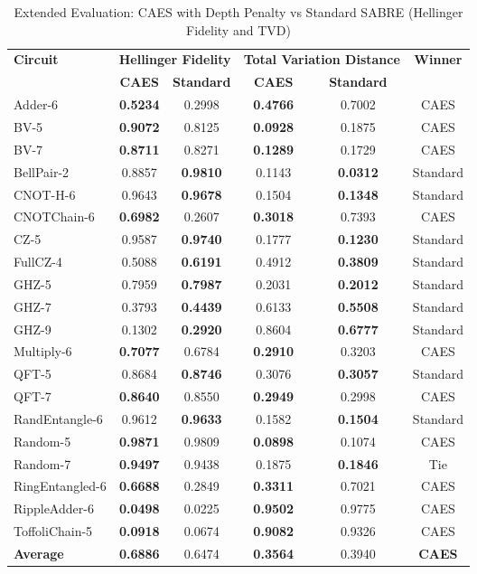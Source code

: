 \documentclass[conference]{IEEEtran}
\begin{document}
\begin{table*}[t]
\centering
\caption{Extended Evaluation: CAES with Depth Penalty vs Standard SABRE (Hellinger Fidelity and TVD)}
\label{tab:extended_results}
\scriptsize
\begin{tabular}{|l|c|c|c|c|c|}
\hline
\textbf{Circuit} & \multicolumn{2}{c|}{\textbf{Hellinger Fidelity}} & \multicolumn{2}{c|}{\textbf{Total Variation Distance}} & \textbf{Winner} \\
 & \textbf{CAES} & \textbf{Standard} & \textbf{CAES} & \textbf{Standard} & \\
\hline
Adder-6 & \textbf{0.5234} & 0.2998 & \textbf{0.4766} & 0.7002 & CAES \\
BV-5 & \textbf{0.9072} & 0.8125 & \textbf{0.0928} & 0.1875 & CAES \\
BV-7 & \textbf{0.8711} & 0.8271 & \textbf{0.1289} & 0.1729 & CAES \\
BellPair-2 & 0.8857 & \textbf{0.9810} & 0.1143 & \textbf{0.0312} & Standard \\
CNOT-H-6 & 0.9643 & \textbf{0.9678} & 0.1504 & \textbf{0.1348} & Standard \\
CNOTChain-6 & \textbf{0.6982} & 0.2607 & \textbf{0.3018} & 0.7393 & CAES \\
CZ-5 & 0.9587 & \textbf{0.9740} & 0.1777 & \textbf{0.1230} & Standard \\
FullCZ-4 & 0.5088 & \textbf{0.6191} & 0.4912 & \textbf{0.3809} & Standard \\
GHZ-5 & 0.7959 & \textbf{0.7987} & 0.2031 & \textbf{0.2012} & Standard \\
GHZ-7 & 0.3793 & \textbf{0.4439} & 0.6133 & \textbf{0.5508} & Standard \\
GHZ-9 & 0.1302 & \textbf{0.2920} & 0.8604 & \textbf{0.6777} & Standard \\
Multiply-6 & \textbf{0.7077} & 0.6784 & \textbf{0.2910} & 0.3203 & CAES \\
QFT-5 & 0.8684 & \textbf{0.8746} & 0.3076 & \textbf{0.3057} & Standard \\
QFT-7 & \textbf{0.8640} & 0.8550 & \textbf{0.2949} & 0.2998 & CAES \\
RandEntangle-6 & 0.9612 & \textbf{0.9633} & 0.1582 & \textbf{0.1504} & Standard \\
Random-5 & \textbf{0.9871} & 0.9809 & \textbf{0.0898} & 0.1074 & CAES \\
Random-7 & \textbf{0.9497} & 0.9438 & 0.1875 & \textbf{0.1846} & Tie \\
RingEntangled-6 & \textbf{0.6688} & 0.2849 & \textbf{0.3311} & 0.7021 & CAES \\
RippleAdder-6 & \textbf{0.0498} & 0.0225 & \textbf{0.9502} & 0.9775 & CAES \\
ToffoliChain-5 & \textbf{0.0918} & 0.0674 & \textbf{0.9082} & 0.9326 & CAES \\
\hline
\textbf{Average} & \textbf{0.6886} & 0.6474 & \textbf{0.3564} & 0.3940 & \textbf{CAES} \\
\hline
\end{tabular}
\end{table*}
\end{document}
